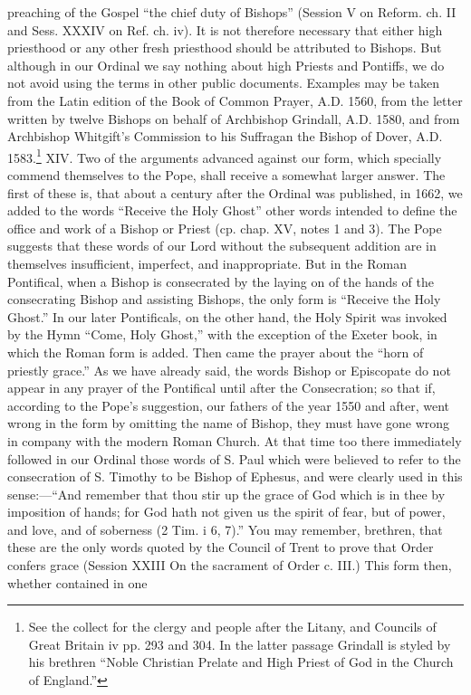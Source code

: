 preaching of the Gospel “the chief duty of Bishops” (Session V on Reform. ch. II and Sess. XXXIV on Ref. ch. iv). It is not therefore necessary that either high priesthood or any other fresh priesthood should be attributed to Bishops. But although in our Ordinal we say nothing about high Priests and Pontiffs, we do not avoid using the terms in other public documents. Examples may be taken from the Latin edition of the Book of Common Prayer, A.D. 1560, from the letter written by twelve Bishops on behalf of Archbishop Grindall, A.D. 1580, and from Archbishop Whitgift’s Commission to his Suffragan the Bishop of Dover, A.D. 1583.\footnote{See the collect for the clergy and people after the Litany, and Councils of Great Britain iv pp. 293 and 304. In the latter passage Grindall is styled by his brethren “Noble Christian Prelate and High Priest of God in the Church of England.”} XIV. Two of the arguments advanced against our form, which specially commend themselves to the Pope, shall receive a somewhat larger answer. The first of these is, that about a century after the Ordinal was published, in 1662, we added to the words “Receive the Holy Ghost” other words intended to define the office and work of a Bishop or Priest (cp. chap. XV, notes 1 and 3). The Pope suggests that these words of our Lord without the subsequent addition are in themselves insufficient, imperfect, and inappropriate. But in the Roman Pontifical, when a Bishop is consecrated by the laying on of the hands of the consecrating Bishop and assisting Bishops, the only form is “Receive the Holy Ghost.” In our later Pontificals, on the other hand, the Holy Spirit was invoked by the Hymn “Come, Holy Ghost,” with the exception of the Exeter book, in which the Roman form is added. Then came the prayer about the “horn of priestly grace.” As we have already said, the words Bishop or Episcopate do not appear in any prayer of the Pontifical until after the Consecration; so that if, according to the Pope’s suggestion, our fathers of the year 1550 and after, went wrong in the form by omitting the name of Bishop, they must have gone wrong in company with the modern Roman Church. At that time too there immediately followed in our Ordinal those words of S. Paul which were believed to refer to the consecration of S. Timothy to be Bishop of Ephesus, and were clearly used in this sense:—“And remember that thou stir up the grace of God which is in thee by imposition of hands; for God hath not given us the spirit of fear, but of power, and love, and of soberness (2 Tim. i 6, 7).” You may remember, brethren, that these are the only words quoted by the Council of Trent to prove that Order confers grace (Session XXIII On the sacrament of Order c. III.) This form then, whether contained in one

